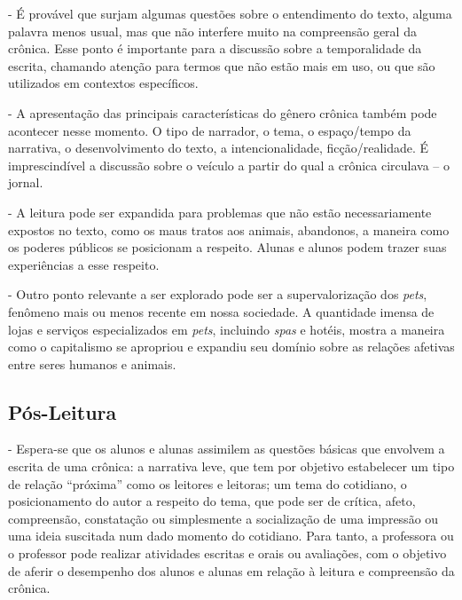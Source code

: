 \documentclass{article}
\begin{document}
- É provável que surjam algumas questões sobre o entendimento do texto,
alguma palavra menos usual, mas que não interfere muito na compreensão
geral da crônica. Esse ponto é importante para a discussão sobre a
temporalidade da escrita, chamando atenção para termos que não estão
mais em uso, ou que são utilizados em contextos específicos.

- A apresentação das principais características do gênero crônica também
pode acontecer nesse momento. O tipo de narrador, o tema, o espaço/tempo
da narrativa, o desenvolvimento do texto, a intencionalidade,
ficção/realidade. É imprescindível a discussão sobre o veículo a partir
do qual a crônica circulava -- o jornal.

- A leitura pode ser expandida para problemas que não estão
necessariamente expostos no texto, como os maus tratos aos animais,
abandonos, a maneira como os poderes públicos se posicionam a respeito.
Alunas e alunos podem trazer suas experiências a esse respeito.

- Outro ponto relevante a ser explorado pode ser a supervalorização dos
\emph{pets}, fenômeno mais ou menos recente em nossa sociedade. A
quantidade imensa de lojas e serviços especializados em \emph{pets},
incluindo \emph{spas} e hotéis, mostra a maneira como o capitalismo se
apropriou e expandiu seu domínio sobre as relações afetivas entre seres
humanos e animais.

{\subsection{Pós-Leitura}}

- Espera-se que os alunos e alunas assimilem as questões básicas que
envolvem a escrita de uma crônica: a narrativa leve, que tem por
objetivo estabelecer um tipo de relação ``próxima'' como os leitores e
leitoras; um tema do cotidiano, o posicionamento do autor a respeito do
tema, que pode ser de crítica, afeto, compreensão, constatação ou
simplesmente a socialização de uma impressão ou uma ideia suscitada num
dado momento do cotidiano. Para tanto, a professora ou o professor pode
realizar atividades escritas e orais ou avaliações, com o objetivo de
aferir o desempenho dos alunos e alunas em relação à leitura e
compreensão da crônica. 
\end{document}
